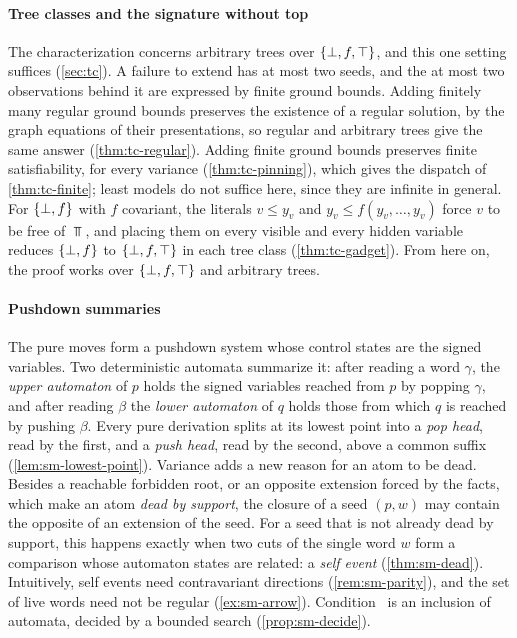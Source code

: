 \paragraph{Tree classes and the signature without top}
The characterization concerns arbitrary trees over $\{\bot,f,\top\}$, and this one
setting suffices (\cref{sec:tc}). A failure to extend has at most two seeds,
and the at most two observations behind it are expressed by finite ground
bounds. Adding finitely many regular
ground bounds preserves the existence of a regular solution, by the graph
equations of their presentations, so regular and arbitrary trees give the same
answer (\cref{thm:tc-regular}). Adding finite ground bounds preserves finite
satisfiability, for every variance (\cref{thm:tc-pinning}), which gives the
dispatch of \cref{thm:tc-finite}; least models do not suffice here, since they
are infinite in general. For $\{\bot,f\}$ with $f$ covariant, the
literals $v\le y_v$ and $y_v\le f(y_v,\ldots,y_v)$ force $v$ to be free of
$\Top$, and placing them on every visible and every hidden variable reduces
$\{\bot,f\}$ to $\{\bot,f,\top\}$ in each tree class (\cref{thm:tc-gadget}).
From here on, the proof works over $\{\bot,f,\top\}$ and arbitrary trees.

\paragraph{Pushdown summaries}
The pure moves form a pushdown system whose control states are the signed
variables. Two deterministic automata summarize it: after reading a word
$\gamma$, the \emph{upper automaton} of $p$ holds the signed variables reached
from $p$ by popping $\gamma$, and after reading $\beta$ the \emph{lower
automaton} of $q$ holds those from which $q$ is reached by pushing $\beta$.
Every pure derivation splits at its lowest point into a \emph{pop head}, read
by the first, and a \emph{push head}, read by the second, above a common
suffix (\cref{lem:sm-lowest-point}). Variance adds a new reason for an atom to
be dead. Besides a reachable forbidden root, or an opposite extension forced
by the facts, which make an atom \emph{dead by support}, the closure of a seed
$(p,w)$ may contain the opposite of an extension of the seed. For a seed that is not already dead
by support, this happens exactly when two cuts of the single word $w$ form a
comparison whose automaton states are related: a \emph{self event} (\cref{thm:sm-dead}). Intuitively, self
events need contravariant directions (\cref{rem:sm-parity}), and the set of
live words need not be regular (\cref{ex:sm-arrow}). Condition \CondI\ is an
inclusion of automata, decided by a bounded search (\cref{prop:sm-decide}).

